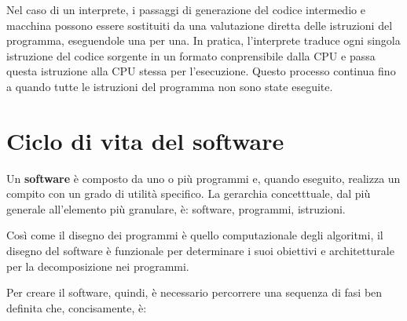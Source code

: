\documentclass[
  letterpaper,
]{scrbook}
\begin{document}
Nel caso di un interprete, i passaggi di generazione del codice
intermedio e macchina possono essere sostituiti da una valutazione
diretta delle istruzioni del programma, eseguendole una per una. In
pratica, l'interprete traduce ogni singola istruzione del codice
sorgente in un formato conprensibile dalla CPU e passa questa istruzione
alla CPU stessa per l'esecuzione. Questo processo continua fino a quando
tutte le istruzioni del programma non sono state eseguite.

\section{Ciclo di vita del software}\label{ciclo-di-vita-del-software}

Un \textbf{software} è composto da uno o più programmi e, quando
eseguito, realizza un compito con un grado di utilità specifico. La
gerarchia concetttuale, dal più generale all'elemento più granulare, è:
software, programmi, istruzioni.

Così come il disegno dei programmi è quello computazionale degli
algoritmi, il disegno del software è funzionale per determinare i suoi
obiettivi e architetturale per la decomposizione nei programmi.

Per creare il software, quindi, è necessario percorrere una sequenza di
fasi ben definita che, concisamente, è:
\end{document}
